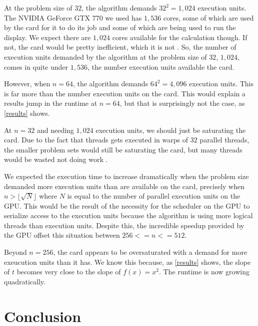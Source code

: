 \documentclass[journal]{IEEEtran}
\begin{document}
At the problem size of $32$, the algorithm demands $32^2=1,024$ execution
units.  The NVIDIA GeForce GTX 770 we used has $1,536$ cores, some of which are
used by the card for it to do its job and some of which are being used to run
the display.  We expect there are $1,024$ cores available for the calculation
though.  If not, the card would be pretty inefficient, which it is not
\cite{cook}.  So, the number of execution units demanded by the algorithm at
the problem size of $32$, $1,024$, comes in quite under $1,536$, the number
execution units available the card.

However, when $n=64$, the algorithm demands $64^2=4,096$ execution units.  This
is far more than the number execution units on the card.  This would explain a
results jump in the runtime at $n=64$, but that is surprisingly not the case,
as \ref{results} shows.

At $n=32$ and needing $1,024$ execution units, we should just be saturating the
card.  Due to the fact that threads gets executed in warps of $32$ parallel
threads, the smaller problem sets would still be saturating the card, but many
threads would be wasted not doing work \cite{nvidia}.

We expected the execution time to increase dramatically when the problem size
demanded more execution units than are available on the card, precisely when
$n>\lfloor\sqrt{N}\rfloor$ where $N$ is equal to the number of parallel
execution units on the GPU.  This would be the result of the necessity for the
scheduler on the GPU to serialize access to the execution units because the
algorithm is using more logical threads than execution units.  Despite this,
the incredible speedup provided by the GPU offset this situation between
$256<=n<=512$.

Beyond $n=256$, the card appears to be oversaturated with a demand for more
exeucution units than it has.  We know this because, as \ref{results} shows,
the slope of $t$ becomes very close to the slope of $f(x)=x^2$.  The runtime is
now growing quadratically.

\section{Conclusion}
\end{document}
